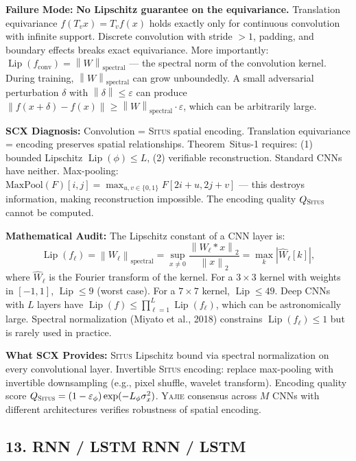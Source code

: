 \documentclass[12pt,a4paper]{article}
\theoremstyle{definition}
\newcommand{\Situs}{\textsc{Situs}}
\newcommand{\Yajie}{\textsc{Yajie}}
\DeclareMathOperator{\Lip}{Lip}
\newcommand{\norm}[1]{\left\lVert#1\right\rVert}
\newcommand{\whyFail}{\noindent\textbf{Failure Mode:} }
\newcommand{\whatMissing}{\noindent\textbf{What SCX Provides:} }
\newcommand{\diagnosis}{\noindent\textbf{SCX Diagnosis:} }
\newcommand{\mathAudit}{\noindent\textbf{Mathematical Audit:} }
\begin{document}
\whyFail{} \textbf{No Lipschitz guarantee on the equivariance.} Translation equivariance $f(T_v x) = T_v f(x)$ holds exactly only for continuous convolution with infinite support. Discrete convolution with stride $>1$, padding, and boundary effects breaks exact equivariance. More importantly: $\Lip(f_{\text{conv}}) = \norm{W}_{\text{spectral}}$ — the spectral norm of the convolution kernel. During training, $\norm{W}_{\text{spectral}}$ can grow unboundedly. A small adversarial perturbation $\delta$ with $\norm{\delta} \le \varepsilon$ can produce $\norm{f(x+\delta) - f(x)} \ge \norm{W}_{\text{spectral}} \cdot \varepsilon$, which can be arbitrarily large.

\diagnosis{} Convolution = \Situs{} spatial encoding. Translation equivariance = encoding preserves spatial relationships. Theorem~Situs-1 requires: (1) bounded Lipschitz $\Lip(\phi) \le L$, (2) verifiable reconstruction. Standard CNNs have neither. Max-pooling: $\text{MaxPool}(F)[i,j] = \max_{u,v \in \{0,1\}} F[2i+u, 2j+v]$ — this destroys information, making reconstruction impossible. The encoding quality $Q_{\Situs}$ cannot be computed.

\mathAudit{} The Lipschitz constant of a CNN layer is:
\[
\Lip(f_\ell) = \norm{W_\ell}_{\text{spectral}} = \sup_{x \neq 0} \frac{\norm{W_\ell * x}_2}{\norm{x}_2} = \max_k |\hat{W}_\ell[k]|,
\]
where $\hat{W}_\ell$ is the Fourier transform of the kernel. For a $3 \times 3$ kernel with weights in $[-1, 1]$, $\Lip \le 9$ (worst case). For a $7 \times 7$ kernel, $\Lip \le 49$. Deep CNNs with $L$ layers have $\Lip(f) \le \prod_{\ell=1}^L \Lip(f_\ell)$, which can be astronomically large. Spectral normalization (Miyato et al., 2018) constrains $\Lip(f_\ell) \le 1$ but is rarely used in practice.

\whatMissing{} \Situs{} Lipschitz bound via spectral normalization on every convolutional layer. Invertible \Situs{} encoding: replace max-pooling with invertible downsampling (e.g., pixel shuffle, wavelet transform). Encoding quality score $Q_{\Situs} = (1-\varepsilon_\phi)\exp(-L_\phi\sigma_x^2)$. \Yajie{} consensus across $M$ CNNs with different architectures verifies robustness of spatial encoding.

\subsection{13. RNN / LSTM RNN / LSTM}
\end{document}
